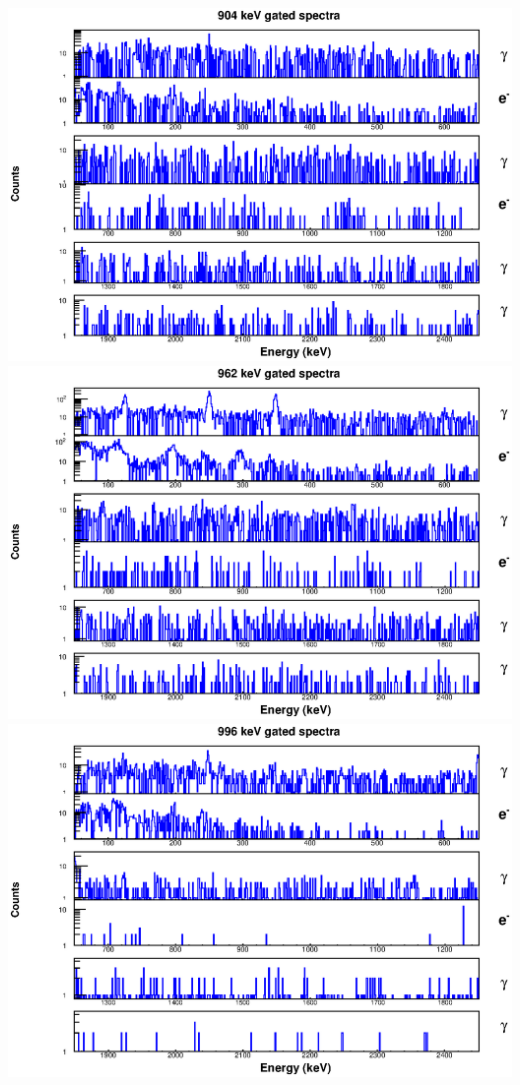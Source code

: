 \includegraphics[scale=0.8]{154Gd_Appendix/904_combined.eps}
\includegraphics[scale=0.8]{154Gd_Appendix/962_combined.eps}
\includegraphics[scale=0.8]{154Gd_Appendix/996_combined.eps}
